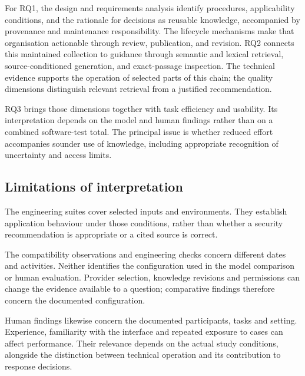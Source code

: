 For RQ1, the design and requirements analysis identify procedures, applicability conditions, and the rationale for decisions as reusable knowledge, accompanied by provenance and maintenance responsibility. The lifecycle mechanisms make that organisation actionable through review, publication, and revision. RQ2 connects this maintained collection to guidance through semantic and lexical retrieval, source-conditioned generation, and exact-passage inspection. The technical evidence supports the operation of selected parts of this chain; the quality dimensions distinguish relevant retrieval from a justified recommendation.

RQ3 brings those dimensions together with task efficiency and usability. Its interpretation depends on the model and human findings rather than on a combined software-test total. The principal issue is whether reduced effort accompanies sounder use of knowledge, including appropriate recognition of uncertainty and access limits.

\subsection{Limitations of interpretation}

The engineering suites cover selected inputs and environments. They establish application behaviour under those conditions, rather than whether a security recommendation is appropriate or a cited source is correct.

The compatibility observations and engineering checks concern different dates and activities. Neither identifies the configuration used in the model comparison or human evaluation. Provider selection, knowledge revisions and permissions can change the evidence available to a question; comparative findings therefore concern the documented configuration.

Human findings likewise concern the documented participants, tasks and setting. Experience, familiarity with the interface and repeated exposure to cases can affect performance. Their relevance depends on the actual study conditions, alongside the distinction between technical operation and its contribution to response decisions.

